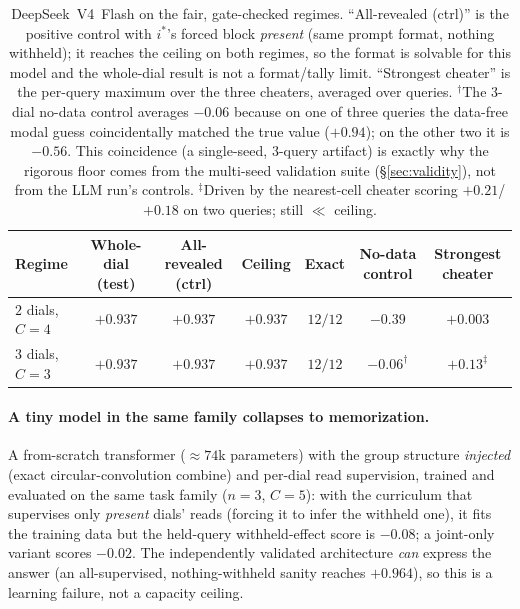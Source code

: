 \documentclass[11pt]{article}
\newcommand{\istar}{i^{\!*}}
\begin{document}
\begin{table}[t]
\centering
\footnotesize
\begin{tabular}{lcccccc}
\toprule
Regime & Whole-dial (test) & All-revealed (ctrl) & Ceiling & Exact & No-data control & Strongest cheater\\
\midrule
$2$ dials, $C{=}4$ & $+0.937$ & $+0.937$ & $+0.937$ & $12/12$ & $-0.39$ & $+0.003$\\
$3$ dials, $C{=}3$ & $+0.937$ & $+0.937$ & $+0.937$ & $12/12$ & $-0.06^{\dagger}$ & $+0.13^{\ddagger}$\\
\bottomrule
\end{tabular}
\caption{DeepSeek~V4~Flash on the fair, gate-checked regimes. ``All-revealed (ctrl)'' is the positive
control with $\istar$'s forced block \emph{present} (same prompt format, nothing withheld); it reaches the
ceiling on both regimes, so the format is solvable for this model and the whole-dial result is not a
format/tally limit. ``Strongest cheater'' is the per-query
maximum over the three cheaters, averaged over queries. $^{\dagger}$The $3$-dial no-data control averages
$-0.06$ because on one of three queries the data-free modal guess coincidentally matched the true value
($+0.94$); on the other two it is $-0.56$. This coincidence (a single-seed, $3$-query artifact) is exactly
why the rigorous floor comes from the multi-seed validation suite (\S\ref{sec:validity}), not from the LLM
run's controls. $^{\ddagger}$Driven by the nearest-cell cheater scoring $+0.21$/$+0.18$ on two queries; still
$\ll$ ceiling.}
\label{tab:llm}
\end{table}

\paragraph{A tiny model in the same family collapses to memorization.}
A from-scratch transformer ($\approx$$74$k parameters) with the group structure \emph{injected} (exact
circular-convolution combine) and per-dial read supervision, trained and evaluated on the same task family
($n{=}3$, $C{=}5$): with the curriculum that supervises only \emph{present} dials' reads (forcing it to
infer the withheld one), it fits the training data but the held-query withheld-effect score is $-0.08$;
a joint-only variant scores $-0.02$. The independently validated architecture \emph{can} express the answer
(an all-supervised, nothing-withheld sanity reaches $+0.964$), so this is a learning failure, not a capacity
ceiling.
\end{document}
